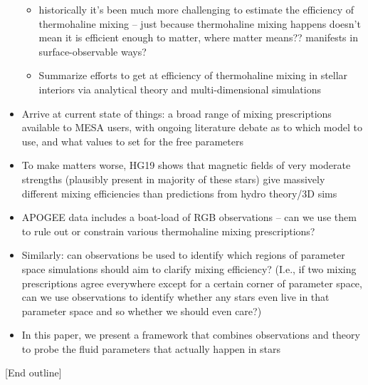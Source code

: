 \begin{itemize}
\begin{itemize}
        \item 
        historically it's been much more challenging to estimate the efficiency of thermohaline mixing -- just because thermohaline mixing happens doesn't mean it is efficient enough to matter, where matter means?? manifests in surface-observable ways?
        
        \item Summarize efforts to get at efficiency of thermohaline mixing in stellar interiors via analytical theory and multi-dimensional simulations
    \end{itemize}

    \item Arrive at current state of things: a broad range of mixing prescriptions available to MESA users, with 
    ongoing literature debate
    as to which model to use, and what values to set for the free parameters
    \item To make matters worse, HG19 shows that magnetic fields of very moderate strengths (plausibly present in majority of these stars) give massively different mixing efficiencies than predictions from hydro theory/3D sims
    \item APOGEE data includes a boat-load of RGB observations -- can we use them to rule out or constrain various thermohaline mixing prescriptions?
    \item Similarly: can observations be used to identify which regions of parameter space simulations should aim to clarify mixing efficiency? (I.e., if two mixing prescriptions agree everywhere except for a certain corner of parameter space, can we use observations to identify whether any stars even live in that parameter space and so whether we should even care?)
    \item In this paper, we present a framework that combines observations and theory to probe the fluid parameters that actually happen in stars
\end{itemize}

[End outline]

